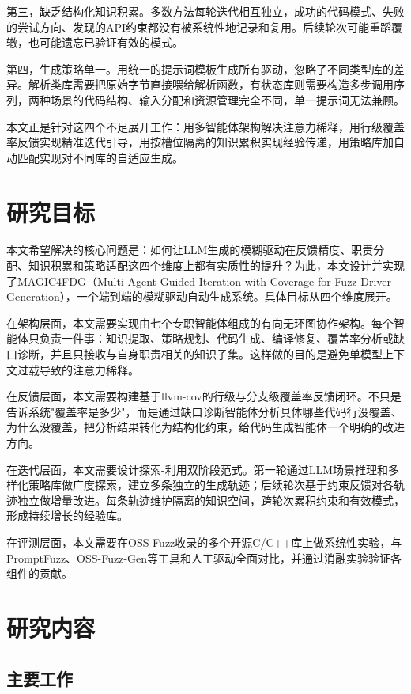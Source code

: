 第三，缺乏结构化知识积累。多数方法每轮迭代相互独立，成功的代码模式、失败的尝试方向、发现的API约束都没有被系统性地记录和复用。后续轮次可能重蹈覆辙，也可能遗忘已验证有效的模式。

第四，生成策略单一。用统一的提示词模板生成所有驱动，忽略了不同类型库的差异。解析类库需要把原始字节直接喂给解析函数，有状态库则需要构造多步调用序列，两种场景的代码结构、输入分配和资源管理完全不同，单一提示词无法兼顾。

本文正是针对这四个不足展开工作：用多智能体架构解决注意力稀释，用行级覆盖率反馈实现精准迭代引导，用按槽位隔离的知识累积实现经验传递，用策略库加自动匹配实现对不同库的自适应生成。

\section{研究目标}

本文希望解决的核心问题是：如何让LLM生成的模糊驱动在反馈精度、职责分配、知识积累和策略适配这四个维度上都有实质性的提升？为此，本文设计并实现了MAGIC4FDG（Multi-Agent Guided Iteration with Coverage for Fuzz Driver Generation），一个端到端的模糊驱动自动生成系统。具体目标从四个维度展开。

在架构层面，本文需要实现由七个专职智能体组成的有向无环图协作架构。每个智能体只负责一件事：知识提取、策略规划、代码生成、编译修复、覆盖率分析或缺口诊断，并且只接收与自身职责相关的知识子集。这样做的目的是避免单模型上下文过载导致的注意力稀释。

在反馈层面，本文需要构建基于llvm-cov的行级与分支级覆盖率反馈闭环。不只是告诉系统"覆盖率是多少"，而是通过缺口诊断智能体分析具体哪些代码行没覆盖、为什么没覆盖，把分析结果转化为结构化约束，给代码生成智能体一个明确的改进方向。

在迭代层面，本文需要设计探索-利用双阶段范式。第一轮通过LLM场景推理和多样化策略库做广度探索，建立多条独立的生成轨迹；后续轮次基于约束反馈对各轨迹独立做增量改进。每条轨迹维护隔离的知识空间，跨轮次累积约束和有效模式，形成持续增长的经验库。

在评测层面，本文需要在OSS-Fuzz收录的多个开源C/C++库上做系统性实验，与PromptFuzz、OSS-Fuzz-Gen等工具和人工驱动全面对比，并通过消融实验验证各组件的贡献。

\section{研究内容}

\subsection{主要工作}

